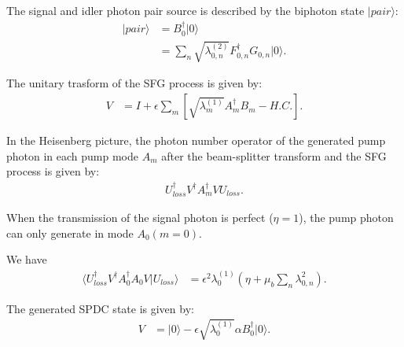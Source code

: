 \documentclass[../../note.tex]{subfiles}
\begin{document}
\begin{definition}
    The signal and idler photon pair source is described by the biphoton state  $\vert pair \rangle$:
    \begin{align}
        \vert pair \rangle
        &= B_0^\dagger \vert 0 \rangle \\
        &= \sum_{n} \sqrt{\lambda_{0,n}^{(2)}} F_{0,n}^\dagger G_{0,n} \vert 0 \rangle.
    \end{align}
\end{definition}

\begin{definition}
    The unitary trasform of the SFG process is given by:
    \begin{align}
        V
        &= I + \epsilon \sum_{m} \left[\sqrt{\lambda_m^{(1)}} A_m^\dagger B_m - H.C. \right].
    \end{align}
\end{definition}

\begin{definition}
    In the Heisenberg picture, the photon number operator of the generated pump photon in each pump mode $A_m$ after the beam-splitter transform and the SFG process is given by:
    \begin{align}
        U^\dagger_{loss} V^\dagger A_{m}^\dagger V U_{loss}.
    \end{align}
\end{definition}

\begin{proposition}
    When the transmission of the signal photon is perfect ($\eta = 1$), the pump photon can only generate in mode $A_0 (m = 0)$.
\end{proposition}

\begin{lemma}
    We have
    \begin{align}
        \langle U^\dagger_{loss} V^\dagger A_0^\dagger A_0 V \vert U_{loss} \rangle
        &= \epsilon^2 \lambda_{0}^{(1)}(\eta + \mu_b \sum_n \lambda_{0,n}^2).
    \end{align}
\end{lemma}

\begin{definition}
    The generated SPDC state is given by:
    \begin{align}
        V
        &= \vert 0 \rangle - \epsilon \sqrt{\lambda_{0}^{(1)}} \alpha B_{0}^\dagger \vert 0 \rangle.
    \end{align}
\end{definition}
\end{document}
